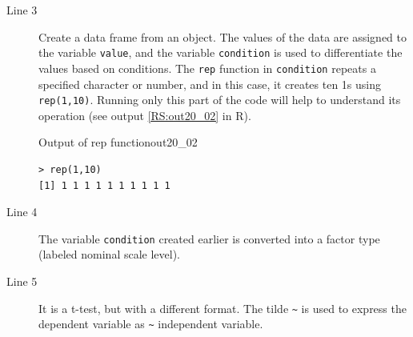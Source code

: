 \begin{description}
	\item[Line 3] Create a data frame from an object. The values of the data are assigned to the variable \texttt{value}, and the variable \texttt{condition} is used to differentiate the values based on conditions. The \texttt{rep} function in \texttt{condition} repeats a specified character or number, and in this case, it creates ten 1s using \texttt{rep(1,10)}. Running only this part of the code will help to understand its operation (see output \ref{RS:out20_02} in R).
	      \begin{Rscreen}{Output of rep function}{out20_02}
		      \begin{verbatim}
> rep(1,10)
[1] 1 1 1 1 1 1 1 1 1 1\end{verbatim}
	      \end{Rscreen}
	\item[Line 4] The variable \texttt{condition} created earlier is converted into a factor type (labeled nominal scale level).
	\item[Line 5] It is a t-test, but with a different format. The tilde \texttt{\~} is used to express the dependent variable as \verb|~| independent variable.
\end{description}
